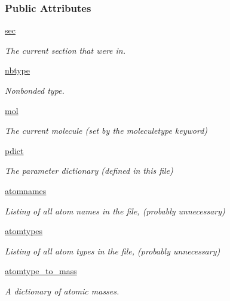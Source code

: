 \subsubsection*{Public Attributes}
\begin{DoxyCompactItemize}
\item 
\hyperlink{classsrc_1_1gmxio_1_1ITP__Reader_a039afd7965f898a4982d68418fc5789f}{sec}
\begin{DoxyCompactList}\small\item\em The current section that we\textquotesingle{}re in. \end{DoxyCompactList}\item 
\hyperlink{classsrc_1_1gmxio_1_1ITP__Reader_ab966f47084cbfd5b2b92f665e1cf0abd}{nbtype}
\begin{DoxyCompactList}\small\item\em Nonbonded type. \end{DoxyCompactList}\item 
\hyperlink{classsrc_1_1gmxio_1_1ITP__Reader_af4eb334ecb67464f7cccef526b50cace}{mol}
\begin{DoxyCompactList}\small\item\em The current molecule (set by the moleculetype keyword) \end{DoxyCompactList}\item 
\hyperlink{classsrc_1_1gmxio_1_1ITP__Reader_abd110480676315a10d158a16055f9112}{pdict}
\begin{DoxyCompactList}\small\item\em The parameter dictionary (defined in this file) \end{DoxyCompactList}\item 
\hyperlink{classsrc_1_1gmxio_1_1ITP__Reader_a05c07b194eb70ef0bb902e1c0b564b0d}{atomnames}
\begin{DoxyCompactList}\small\item\em Listing of all atom names in the file, (probably unnecessary) \end{DoxyCompactList}\item 
\hyperlink{classsrc_1_1gmxio_1_1ITP__Reader_a07503bb3ca6d969f3198dfad1c554fd0}{atomtypes}
\begin{DoxyCompactList}\small\item\em Listing of all atom types in the file, (probably unnecessary) \end{DoxyCompactList}\item 
\hyperlink{classsrc_1_1gmxio_1_1ITP__Reader_aa2d64bc0d85487e04c8dbd8e7600f3cb}{atomtype\+\_\+to\+\_\+mass}
\begin{DoxyCompactList}\small\item\em A dictionary of atomic masses. \end{DoxyCompactList}\item 

\end{DoxyCompactItemize}
